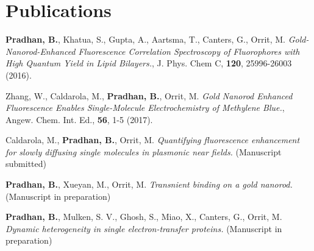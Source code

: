 \chapter*{Publications}
\label{ch:Publications}

\begin{enumerate}{%

	\item \textbf{Pradhan, B.}, Khatua, S., Gupta, A., Aartsma, T., Canters, G., Orrit, M. \textit{Gold-Nanorod-Enhanced Fluorescence Correlation Spectroscopy of Fluorophores with High Quantum Yield in Lipid Bilayers.}, J. Phys. Chem C, \textbf{120}, 25996-26003 (2016).
	
	\item Zhang, W., Caldarola, M., \textbf{Pradhan, B.}, Orrit, M. \textit{Gold Nanorod Enhanced Fluorescence Enables Single-Molecule Electrochemistry of Methylene Blue.}, Angew. Chem. Int. Ed., \textbf{56}, 1-5 (2017).

	\item Caldarola, M., \textbf{Pradhan, B.}, Orrit, M. \textit{Quantifying fluorescence enhancement for slowly diffusing single molecules in plasmonic near fields.} (Manuscript submitted)

	\item \textbf{Pradhan, B.}, Xueyan, M., Orrit, M. \textit{Transnient binding on a gold nanorod.} (Manuscript in preparation)

	\item \textbf{Pradhan, B.}, Mulken, S. V., Ghosh, S., Miao, X., Canters, G., Orrit, M. \textit{Dynamic heterogeneity in single electron-transfer proteins.} (Manuscript in preparation)


}\end{enumerate}